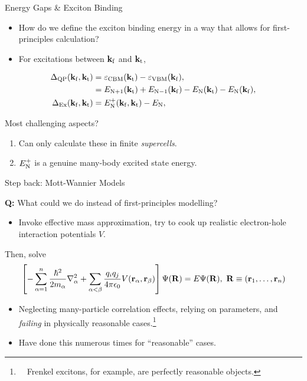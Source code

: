 \documentclass[10pt, pdf, hyperref={draft}, usenames, dvipsnames]{beamer}
\newcommand{\kfr}{{\bf k}_{\rm f}}
\newcommand{\kto}{{\bf k}_{\rm t}}
\begin{document}
\begin{frame}{Energy Gaps \& Exciton Binding}

\begin{itemize}
  \item How do we define the exciton binding energy in a way that allows for
  first-principles calculation?
  \item For excitations between ${\kfr}$ and ${\kto}$,
\end{itemize}
\begin{align}
  \Delta_{\text{QP}}(\kfr,\kto) &= \varepsilon_{\text{CBM}}(\kto) -
  \varepsilon_{\text{VBM}}(\kfr), \nonumber \\
   &=E_{{\rm N}+1}(\kto)+E_{{\rm N}-1}(\kfr)-
  E_{\rm N}(\kto)-E_{\rm N}(\kfr), \nonumber \\
  \Delta_{\text{Ex}}(\kfr,\kto) &= E^{+}_{\rm N}(\kfr, \kto) - E_{\rm N},
\end{align}

Most challenging aspects?

\begin{enumerate}
  \item Can only calculate these in finite \textit{supercells}.
  \item $E^{+}_{\rm N}$ is a genuine many-body excited state energy.
\end{enumerate}

\end{frame}

\begin{frame}{Step back: Mott-Wannier Models}

\textbf{Q:} What could we do instead of first-principles modelling?

\begin{itemize}
  \item Invoke effective mass approximation, try to cook up realistic
  electron-hole interaction potentials
  $V$.
\end{itemize}

Then, solve
\begin{equation}
  \left[ -\sum^{n}_{\alpha=1}\dfrac{\hbar^2}{2m_{\alpha}}\nabla^{2}_{\alpha}  +
  \sum_{\alpha<\beta} \dfrac{q_i q_j}{4\pi\epsilon_0}V({\bf r}_{\alpha},{\bf
  r}_{\beta})
  \right]\Psi({\bf R}) = E\Psi({\bf R}),\ {\bf R} \equiv ({\bf r}_1,\ldots,{\bf
  r}_n)\label{eq:fpse}
\end{equation}

\begin{itemize}
  \item Neglecting many-particle correlation effects, relying on parameters,
  and \textit{failing} in physically reasonable cases.\footnote{~~Frenkel
  excitons, for example, are perfectly reasonable objects.}
  \item Have done this numerous times for ``reasonable''
  cases.
\end{itemize}

\end{frame}
\end{document}
